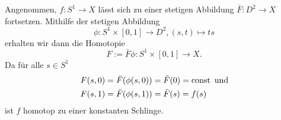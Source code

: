 \documentclass[a4paper,10pt]{article}
\begin{document}
Angenommen, $f: S^1 \to X$ lässt sich zu einer stetigen Abbildung $\bar{F} : D^2 \to X$ fortsetzen. Mithilfe der stetigen Abbildung
\[
 \phi: S^1 \times [0,1] \to D^2, (s,t) \mapsto ts
\]
erhalten wir dann die Homotopie
\[
 F := \bar{F} \phi : S^1 \times [0,1] \to X.
\]
Da für alle $s \in S^1$
\begin{align*}
 F(s,0) &= \bar{F}(\phi(s,0)) = \bar{F}(0) = \operatorname{const} \text{ und} \\
 F(s,1) &= \bar{F}(\phi(s,1)) = \bar{F}(s) = f(s)
\end{align*}
ist $f$ homotop zu einer konstanten Schlinge.
\end{document}
